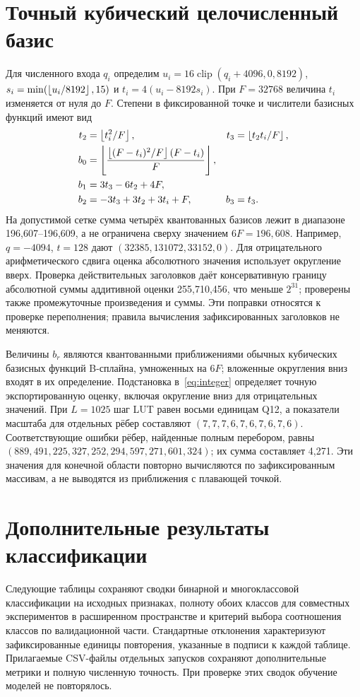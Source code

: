 \appendix
\section{Точный кубический целочисленный базис}
\label{app:arithmetic}
Для численного входа $q_i$ определим $u_i=16\operatorname{clip}(q_i+4096,0,8192)$, $s_i=\min(\left\lfloor u_i/8192\right\rfloor,15)$ и $t_i=4(u_i-8192s_i)$. При $F=32768$ величина $t_i$ изменяется от нуля до $F$. Степени в фиксированной точке и числители базисных функций имеют вид
\begin{align}
t_2&=\left\lfloor t_i^2/F\right\rfloor,&t_3&=\left\lfloor t_2t_i/F\right\rfloor,\\
b_0&=\left\lfloor \frac{\left\lfloor (F-t_i)^2/F\right\rfloor(F-t_i)}{F}\right\rfloor,\\
b_1&=3t_3-6t_2+4F,\\
b_2&=-3t_3+3t_2+3t_i+F,&b_3&=t_3.
\end{align}
На допустимой сетке сумма четырёх квантованных базисов лежит в диапазоне 196,607--196,609, а не ограничена сверху значением $6F=196,608$. Например, $q=-4094$, $t=128$ дают $(32385,131072,33152,0)$. Для отрицательного арифметического сдвига оценка абсолютного значения использует округление вверх. Проверка действительных заголовков даёт консервативную границу абсолютной суммы аддитивной оценки 255,710,456, что меньше $2^{31}$; проверены также промежуточные произведения и суммы. Эти поправки относятся к проверке переполнения; правила вычисления зафиксированных заголовков не меняются.

Величины $b_r$ являются квантованными приближениями обычных кубических базисных функций B-сплайна, умноженных на $6F$; вложенные округления вниз входят в их определение. Подстановка в~\eqref{eq:integer} определяет точную экспортированную оценку, включая округление вниз для отрицательных значений. При $L=1025$ шаг LUT равен восьми единицам Q12, а показатели масштаба для отдельных рёбер составляют $(7,7,7,6,7,6,7,6,7,6)$. Соответствующие ошибки рёбер, найденные полным перебором, равны $(889,491,225,327,252,294,597,271,601,324)$; их сумма составляет 4,271. Эти значения для конечной области повторно вычисляются по зафиксированным массивам, а не выводятся из приближения с плавающей точкой.



\FloatBarrier
\section{Дополнительные результаты классификации}
\label{app:results}
Следующие таблицы сохраняют сводки бинарной и многоклассовой классификации на исходных признаках, полноту обоих классов для совместных экспериментов в расширенном пространстве и критерий выбора соотношения классов по валидационной части. Стандартные отклонения характеризуют зафиксированные единицы повторения, указанные в подписи к каждой таблице. Прилагаемые CSV-файлы отдельных запусков сохраняют дополнительные метрики и полную численную точность. При проверке этих сводок обучение моделей не повторялось.



